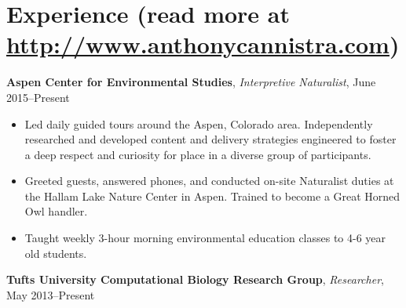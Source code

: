 \documentclass[10pt, letter]{article}
\begin{document}
\vspace{-15pt}
\section*{Experience \textnormal{\small (read more at \url{http://www.anthonycannistra.com})}}
{\bf Aspen Center for Environmental Studies}, {\em Interpretive Naturalist}, June 2015--Present\\
\vspace*{-.15in}
\begin{itemize}[topsep=0pt,itemsep=-1pt]
  \item Led daily guided tours around the Aspen, Colorado area. Independently researched and developed content and delivery strategies engineered to foster a deep respect and curiosity for place in a diverse group of participants. 
  \item Greeted guests, answered phones, and conducted on-site Naturalist duties at the Hallam Lake Nature Center in Aspen. Trained to become a Great Horned Owl handler.
  \item Taught weekly 3-hour morning environmental education classes to 4-6 year old students.
\end{itemize}
\vspace{6pt}
{\bf Tufts University Computational Biology Research Group}, {\em Researcher}, May 2013--Present\\
\vspace*{-.15in} 
\end{document}

